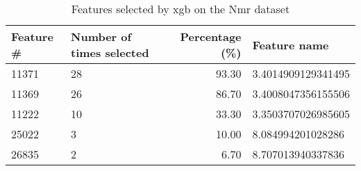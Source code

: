 \begin{table}
\caption{Features selected by xgb on the Nmr dataset}
\label{tab:features_xgb_nmr}
\begin{tabular}{llrl}
\toprule
Feature \# & Number of times selected & Percentage (\%) & Feature name \\
\midrule
11371 & 28 & 93.30 & 3.4014909129341495 \\
11369 & 26 & 86.70 & 3.4008047356155506 \\
11222 & 10 & 33.30 & 3.3503707026985605 \\
25022 & 3 & 10.00 & 8.084994201028286 \\
26835 & 2 & 6.70 & 8.707013940337836 \\
\bottomrule
\end{tabular}
\end{table}
